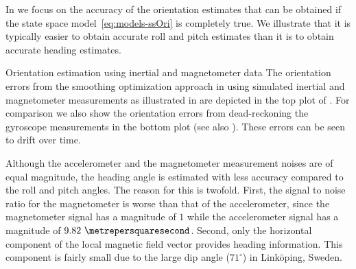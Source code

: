 In  we focus on the accuracy of the orientation estimates that can be obtained if the state space model~\eqref{eq:models-ssOri} is completely true. We illustrate that it is typically easier to obtain accurate roll and pitch estimates than it is to obtain accurate heading estimates. 

\begin{myexample}{Orientation estimation using inertial and magnetometer data}%
\label{ex:oriEst-simOriErrors}%
The orientation errors from the smoothing optimization approach in  using simulated inertial and magnetometer measurements as illustrated in  are depicted in the top plot of . For comparison we also show the orientation errors from dead-reckoning the gyroscope measurements in the bottom plot (see also ). These errors can be seen to drift over time. 

Although the accelerometer and the magnetometer measurement noises are of equal magnitude, the heading angle is estimated with less accuracy compared to the roll and pitch angles. The reason for this is twofold. First, the signal to noise ratio for the magnetometer is worse than that of the accelerometer, since the magnetometer signal has a magnitude of $1$ while the accelerometer signal has a magnitude of $9.82~\metrepersquaresecond$. Second, only the horizontal component of the local magnetic field vector provides heading information. This component is fairly small due to the large dip angle ($71^\circ$) in Link\"oping, Sweden. 
\end{myexample}

